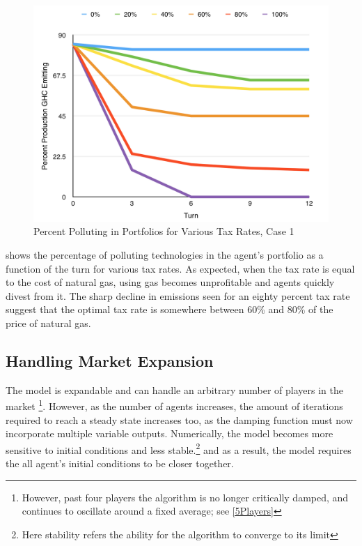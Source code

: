 \documentclass[12pt]{article}
\begin{document}
	\begin{figure}[ht!]
		\begin{center}
		\includegraphics[scale = .4]{investment.png}
		\caption{Percent Polluting in Portfolios for Various Tax Rates, Case 1}
		\label{results2}
		\end{center}
	\end{figure}

 shows the percentage of polluting technologies in the agent's portfolio as a function of the turn for various tax rates. As expected, when the tax rate is equal to the cost of natural gas, using gas becomes unprofitable and agents quickly divest from it. The sharp decline in emissions seen for an eighty percent tax rate suggest that the optimal tax rate is somewhere between 60\% and 80\% of the price of natural gas.

\subsection{Handling Market Expansion} \label{competetion}
The model is expandable and can handle an arbitrary number of players in the market \footnote{However, past four players the algorithm is no longer critically damped, and continues to oscillate around a fixed average; see \cref{5Players}}. However, as the number of agents increases, the amount of iterations required to reach a steady state increases too, as the damping function must now incorporate multiple variable outputs. Numerically, the model becomes more sensitive to initial conditions and less stable.\footnote{Here stability refers the ability for the algorithm to converge to its limit} and as a result, the model requires the all agent's initial conditions to be closer together. 
\end{document}
